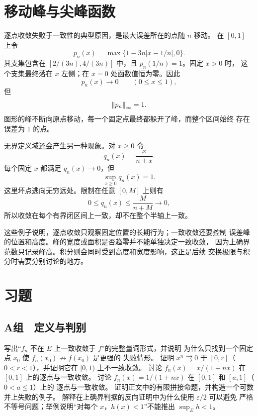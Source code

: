 \section{移动峰与尖峰函数}

逐点收敛失败于一致性的典型原因，是最大误差所在的点随 \(n\) 移动。
在 \([0,1]\) 上令
\[
 p_n(x)=\max\{1-3n|x-1/n|,0\}.
\]
其支集包含在
\([2/(3n),4/(3n)]\) 中，且 \(p_n(1/n)=1\)。固定 \(x>0\) 时，
这个支集最终落在 \(x\) 左侧；在 \(x=0\) 处函数值恒为零。因此
\[
 p_n(x)\to0\qquad(0\le x\le1),
\]
但
\[
 \left\lVert p_n\right\rVert_\infty=1.
\]
图形的峰不断向原点移动，每一个固定点最终都躲开了峰，而整个区间始终
存在误差为 \(1\) 的点。

无界定义域还会产生另一种现象。对 \(x\ge0\) 令
\[
 q_n(x)=\frac{x}{n+x}.
\]
每个固定 \(x\) 都满足 \(q_n(x)\to0\)，但
\[
 \sup_{x\ge0}q_n(x)=1.
\]
这里坏点逃向无穷远处。限制在任意 \([0,M]\) 上则有
\[
 0\le q_n(x)\le \frac{M}{n+M}\to0,
\]
所以收敛在每个有界闭区间上一致，却不在整个半轴上一致。

这些例子说明，逐点收敛只观察固定位置的长期行为；一致收敛还要控制
误差峰的位置和高度。峰的宽度或面积是否趋零并不能单独决定一致收敛，
因为上确界范数只记录峰高。积分则会同时受到高度和宽度影响，这正是后续
交换极限与积分时需要分别讨论的地方。

\section*{习题}

\subsection*{A组　定义与判别}
\begin{enumerate}[label=\textbf{\thechapter.\arabic*.}]
 写出“\(f_n\) 不在 \(E\) 上一致收敛于 \(f\)”的完整量词形式，并说明
 为什么只找到一个固定点 \(x_0\) 使 \(f_n(x_0)\not\to f(x_0)\) 是更强的
 失败情形。
 证明 \(x^n\rightrightarrows0\) 于 \([0,r]\)（\(0<r<1\)），并证明它在
 \([0,1)\) 上不一致收敛。
 讨论 \(f_n(x)=x/(1+nx)\) 在 \([0,1]\) 上的逐点与一致收敛。
 讨论 \(f_n(x)=1/(1+nx)\) 在 \([0,1]\) 和 \([a,1]\)（\(0<a\le1\)）上的
 逐点与一致收敛。
 证明正文中的有限拼接命题，并构造一个可数并上失败的例子。
 解释在上确界判据的反向证明中为什么使用 \(\varepsilon/2\) 可以避免
 严格不等号问题；举例说明“对每个 \(x\)，\(h(x)<1\)”不能推出
 \(\sup_Eh<1\)。
\end{enumerate}

